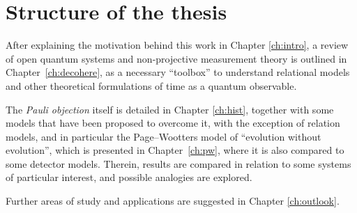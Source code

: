 \section{Structure of the thesis}\label{sec:struct}

After explaining the motivation behind this work in Chapter \ref{ch:intro},
a review of open quantum systems and non-projective measurement theory
is outlined in Chapter~\ref{ch:decohere}, as a necessary ``toolbox''
to understand relational models and other theoretical formulations
of time as a quantum observable.

The \emph{Pauli objection} itself is detailed in Chapter \ref{ch:hist},
together with some models that have been proposed to overcome it,
with the exception of relation models, and in particular the Page--Wootters model
of ``evolution without evolution'',
which is presented in Chapter~\ref{ch:pw},
where it is also compared to some detector models.
Therein, results are compared in relation to some systems of particular interest,
and possible analogies are explored.

Further areas of study and applications are suggested in Chapter \ref{ch:outlook}.